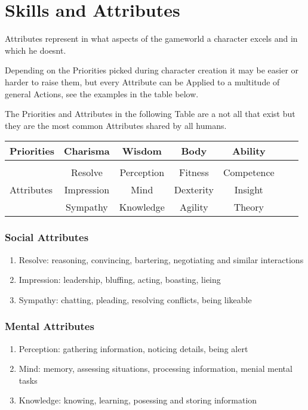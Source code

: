 \chapter{Skills and Attributes}\label{ch:skillsandattributes}
Attributes represent in what aspects of the gameworld a character excels and in which he doesnt.\par
Depending on the Priorities picked during character creation it may be easier or harder to raise them, but every
Attribute can be Applied to a multitude of general Actions, see the examples in the table below.\par
The Priorities and Attributes in the following Table are a not all that exist
but they are the most common Attributes shared by all humans.\vspace{1cm}
\begin{tabular}{l||cccccc}
    Priorities      &Charisma      &Wisdom         &Body        &Ability    \\\hline\\
    &Resolve       &Perception     &Fitness     &Competence   \\
    Attributes      &Impression    &Mind           &Dexterity   &Insight   \\
    &Sympathy      &Knowledge      &Agility     &Theory   \\



\end{tabular}\vspace{1cm}
\subsection{Social Attributes}\label{subsec:charisma-attributes}
\begin{enumerate}[label= -]
    \item {Resolve}: reasoning, convincing, bartering, negotiating and similar interactions
    \item {Impression}: leadership, bluffing, acting, boasting, lieing
    \item {Sympathy}: chatting, pleading, resolving conflicts, being likeable
\end{enumerate}
\subsection{Mental Attributes}\label{subsec:mental-attributes}
\begin{enumerate}[label=-]
    \item {Perception}: gathering information, noticing details, being alert
    \item {Mind}: memory, assessing situations, processing information, menial mental tasks
    \item {Knowledge}: knowing, learning, posessing and storing information
\end{enumerate}
